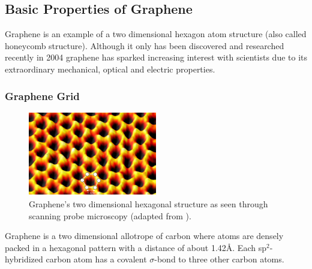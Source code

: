 \subsection{Basic Properties of Graphene}

Graphene is an example of a two dimensional hexagon atom structure (also called honeycomb structure). Although it only has been discovered and researched recently in 2004\cite{novoselov} graphene has sparked increasing interest with scientists due to its extraordinary mechanical, optical and electric properties.

\subsubsection{Graphene Grid}
\begin{figure}[!h]
  \centering
  \includegraphics[width=0.5\textwidth]{./images/graphene-spm.png}
  \caption{Graphene's two dimensional hexagonal structure as seen through scanning probe microscopy (adapted from \mcite).}
\end{figure}

Graphene is a two dimensional allotrope of carbon where atoms are densely packed in a hexagonal pattern with a distance of about 1.42Å. Each sp$^2$-hybridized carbon atom has a covalent $\sigma$-bond to three other carbon atoms.

